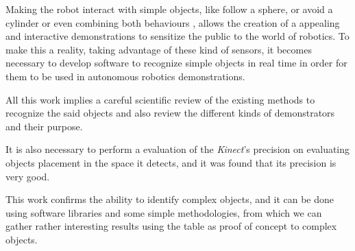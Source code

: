 Making the robot interact with simple objects, like follow a sphere, or avoid a cylinder or even combining both behaviours , allows the creation of a appealing and interactive demonstrations to sensitize the public to the world of robotics. To make this a reality, taking advantage of these kind of sensors, it becomes necessary to develop software to recognize simple objects in real time in order for them to be used in autonomous robotics demonstrations.

All this work implies a careful scientific review of the existing methods to recognize the said objects and also review the different kinds of demonstrators and their purpose.

It is also necessary to perform a evaluation of the \emph{Kinect}'s precision on evaluating objects placement in the space it detects, and it was found that its precision is very good.

This work confirms the ability to identify complex objects, and it can be done using software libraries and some simple methodologies, from which we can gather rather interesting results using the table as proof of concept to complex objects.
